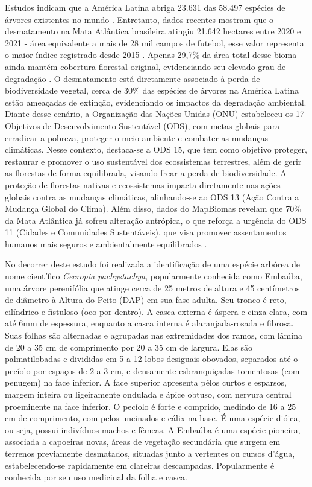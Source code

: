 Estudos indicam que a América Latina abriga 23.631 das 58.497 espécies de árvores existentes no mundo \cite{bgci}. Entretanto, dados recentes mostram que o desmatamento na Mata Atlântica brasileira atingiu 21.642 hectares entre 2020 e 2021 - área equivalente a mais de 28 mil campos de futebol, esse valor representa o maior índice registrado desde 2015 \cite{atlas-mata-atlantica}. Apenas 29,7\% da área total desse bioma ainda mantém cobertura florestal original, evidenciando seu elevado grau de degradação \cite{mapbiomas}. O desmatamento está diretamente associado à perda de biodiversidade vegetal, cerca de 30\% das espécies de árvores na América Latina estão ameaçadas de extinção, evidenciando os impactos da degradação ambiental. Diante desse cenário, a Organização das Nações Unidas (ONU) estabeleceu os 17 Objetivos de Desenvolvimento Sustentável (ODS), com metas globais para erradicar a pobreza, proteger o meio ambiente e combater as mudanças climáticas. Nesse contexto, destaca-se a ODS 15, que tem como objetivo proteger, restaurar e promover o uso sustentável dos ecossistemas terrestres, além de gerir as florestas de forma equilibrada, visando frear a perda de biodiversidade. A proteção de florestas nativas e ecossistemas impacta diretamente nas ações globais contra as mudanças climáticas, alinhando-se ao ODS 13 (Ação Contra a Mudança Global do Clima). Além disso, dados do MapBiomas revelam que 70\% da Mata Atlântica já sofreu alteração antrópica, o que reforça a urgência do ODS 11 (Cidades e Comunidades Sustentáveis), que visa promover assentamentos humanos mais seguros e ambientalmente equilibrados \cite{agenda2030}. 

No decorrer deste estudo foi realizada a identificação de uma espécie arbórea de nome científico \textit{Cecropia pachystachya}, popularmente conhecida como Embaúba, uma árvore perenifólia que atinge cerca de 25 metros de altura e 45 centímetros de diâmetro à Altura do Peito (DAP) em sua fase adulta. Seu tronco é reto, cilíndrico e fistuloso (oco por dentro). A casca externa é áspera e cinza-clara, com até 6mm de espessura, enquanto a casca interna é alaranjada-rosada e fibrosa. Suas folhas são alternadas e agrupadas nas extremidades dos ramos, com lâmina de 20 a 35 cm de comprimento por 20 a 35 cm de largura. Elas são palmatilobadas e divididas em 5 a 12 lobos desiguais obovados, separados até o pecíolo por espaços de 2 a 3 cm, e densamente esbranquiçadas-tomentosas (com penugem) na face inferior. A face superior apresenta pêlos curtos e esparsos, margem inteira ou ligeiramente ondulada e ápice obtuso, com nervura central proeminente na face inferior. O pecíolo é forte e comprido, medindo de 16 a 25 cm de comprimento, com pelos uncinados e cálix na base. É uma espécie dióica, ou seja, possui indivíduos machos e fêmeas. A Embaúba é uma espécie pioneira, associada a capoeiras novas, áreas de vegetação secundária que surgem em terrenos previamente desmatados, situadas junto a vertentes ou cursos d’água, estabelecendo-se rapidamente em clareiras descampadas. Popularmente é conhecida por seu uso medicinal da folha e casca. \cite{carvalho2006embauba} 

